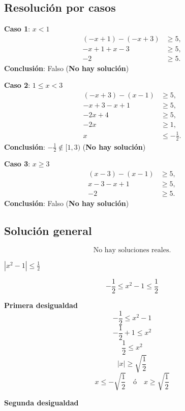 \subsection*{Resoluci\'on por casos}

\textbf{Caso 1}: $x < 1$
\begin{align*}
    (-x+1) - (-x+3) &\geq 5,\\
    -x+1 + x -3 &\geq 5,\\
    -2 &\geq 5.
\end{align*}
\textbf{Conclusi\'on}: Falso \quad (\textbf{No hay soluci\'on})

\textbf{Caso 2}: $1 \leq x < 3$
\begin{align*}
    (-x+3) - (x-1) &\geq 5,\\
    -x+3 - x +1 &\geq 5,\\
    -2x +4 &\geq 5,\\
    -2x &\geq 1,\\
    x &\leq -\frac{1}{2}.
\end{align*}
\textbf{Conclusi\'on}: $-\frac{1}{2} \notin [1,3)$ \quad (\textbf{No hay soluci\'on})

\textbf{Caso 3}: $x \geq 3$
\begin{align*}
    (x-3) - (x-1) &\geq 5,\\
    x-3 - x +1 &\geq 5,\\
    -2 &\geq 5.
\end{align*}
\textbf{Conclusi\'on}: Falso \quad (\textbf{No hay soluci\'on})

\subsection*{Soluci\'on general}

\begin{equation*}
    \text{No hay soluciones reales.}
\end{equation*}




\hspace*{1cm}\textbf{$|x^2-1|\leq \frac{1}{2}$}

\[
-\frac{1}{2} \leq x^2 - 1 \leq \frac{1}{2}
\]

\textbf{Primera desigualdad}
\[
-\frac{1}{2} \leq x^2 - 1
\]
\[
-\frac{1}{2} + 1 \leq x^2
\]
\[
\frac{1}{2} \leq x^2
\]
\[
|x| \geq \sqrt{\frac{1}{2}}
\]
\[
x \leq -\sqrt{\frac{1}{2}} \quad \text{ó} \quad x \geq \sqrt{\frac{1}{2}}
\]

\textbf{Segunda desigualdad}

